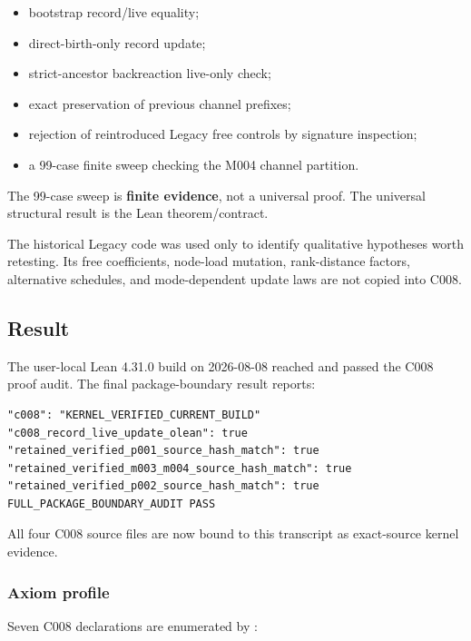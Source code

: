 \begin{itemize}
\tightlist
\item
  bootstrap record/live equality;
\item
  direct-birth-only record update;
\item
  strict-ancestor backreaction live-only check;
\item
  exact preservation of previous channel prefixes;
\item
  rejection of reintroduced Legacy free controls by signature
  inspection;
\item
  a 99-case finite \texttt{\protect{}} sweep checking the M004 channel
  partition.
\end{itemize}

The 99-case sweep is \textbf{finite evidence}, not a universal proof.
The universal structural result is the Lean theorem/contract.

The historical Legacy code was used only to identify qualitative
hypotheses worth retesting. Its free coefficients, node-load mutation,
rank-distance factors, alternative schedules, and mode-dependent update
laws are not copied into C008.

\subsection{Result}\label{result-26}

The user-local Lean 4.31.0 build on 2026-08-08 reached and passed the
C008 proof audit. The final package-boundary result reports:

\begin{verbatim}
"c008": "KERNEL_VERIFIED_CURRENT_BUILD"
"c008_record_live_update_olean": true
"retained_verified_p001_source_hash_match": true
"retained_verified_m003_m004_source_hash_match": true
"retained_verified_p002_source_hash_match": true
FULL_PACKAGE_BOUNDARY_AUDIT PASS
\end{verbatim}

All four C008 source files are now bound to this transcript as
exact-source kernel evidence.

\subsubsection{Axiom profile}\label{axiom-profile-11}

Seven C008 declarations are enumerated by \texttt{\protect{}}:

